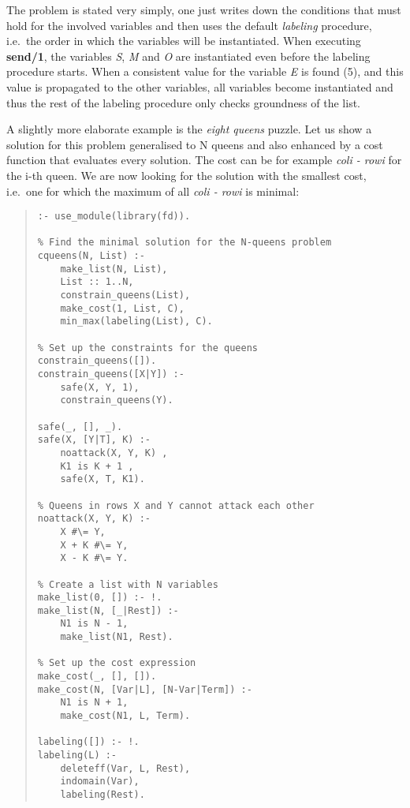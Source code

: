 The problem is stated very simply, one just writes down the conditions
that must hold for the involved variables and then uses the default
{\it labeling} procedure, i.e.\ the order in which the variables
will be instantiated.
When executing {\bf send/1}, the variables {\it S}, {\it M}
and {\it O} are instantiated even before the labeling
procedure starts.
When a consistent value for the variable {\it E} is found (5),
and this value is propagated to the other variables, all
variables become instantiated and thus the rest of the labeling
procedure only checks groundness of the list.

A slightly more elaborate example is the {\it eight queens}
puzzle.
Let us show a solution for this problem generalised to N queens
and also enhanced by a cost function that evaluates
every solution.
The cost can be for example
 {\it coli - rowi} 
for the i-th queen.
We are now looking for the solution with the smallest cost,
i.e.\ one for which the maximum of all
{\it coli - rowi} 
is minimal:

\begin{quote}
\begin{verbatim}
:- use_module(library(fd)).

% Find the minimal solution for the N-queens problem
cqueens(N, List) :-
    make_list(N, List),
    List :: 1..N,
    constrain_queens(List),
    make_cost(1, List, C),
    min_max(labeling(List), C).

% Set up the constraints for the queens
constrain_queens([]).
constrain_queens([X|Y]) :-
    safe(X, Y, 1),
    constrain_queens(Y).

safe(_, [], _).
safe(X, [Y|T], K) :-
    noattack(X, Y, K) ,
    K1 is K + 1 ,
    safe(X, T, K1).

% Queens in rows X and Y cannot attack each other
noattack(X, Y, K) :-
    X #\= Y,
    X + K #\= Y,
    X - K #\= Y.

% Create a list with N variables
make_list(0, []) :- !.
make_list(N, [_|Rest]) :-
    N1 is N - 1,
    make_list(N1, Rest).

% Set up the cost expression
make_cost(_, [], []).
make_cost(N, [Var|L], [N-Var|Term]) :-
    N1 is N + 1,
    make_cost(N1, L, Term).

labeling([]) :- !.
labeling(L) :-
    deleteff(Var, L, Rest),
    indomain(Var),
    labeling(Rest).
\end{verbatim}
\end{quote}

